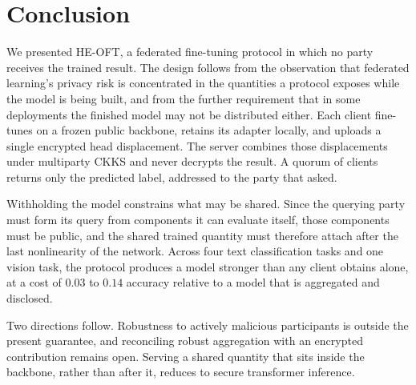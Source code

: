 \section{Conclusion}
\label{sec:conclusion}

We presented HE-OFT, a federated fine-tuning protocol in which no party receives
the trained result. The design follows from the observation that federated
learning's privacy risk is concentrated in the quantities a protocol exposes while
the model is being built, and from the further requirement that in some
deployments the finished model may not be distributed either. Each client
fine-tunes on a frozen public backbone, retains its adapter locally, and uploads a
single encrypted head displacement. The server combines those displacements under
multiparty CKKS and never decrypts the result. A quorum of clients returns only the predicted label, addressed to
the party that asked.

Withholding the model constrains what may be shared. Since the querying party must
form its query from components it can evaluate itself, those components must be
public, and the shared trained quantity must therefore attach after the last
nonlinearity of the network. Across four text
classification tasks and one vision task, the protocol produces a model
stronger than any client obtains alone, at a cost of $0.03$ to
$0.14$ accuracy relative to a model that is aggregated and disclosed.

Two directions follow. Robustness to actively malicious participants is outside
the present guarantee, and reconciling robust aggregation with an encrypted
contribution remains open. Serving a shared quantity that sits inside the
backbone, rather than after it, reduces to secure transformer inference.
